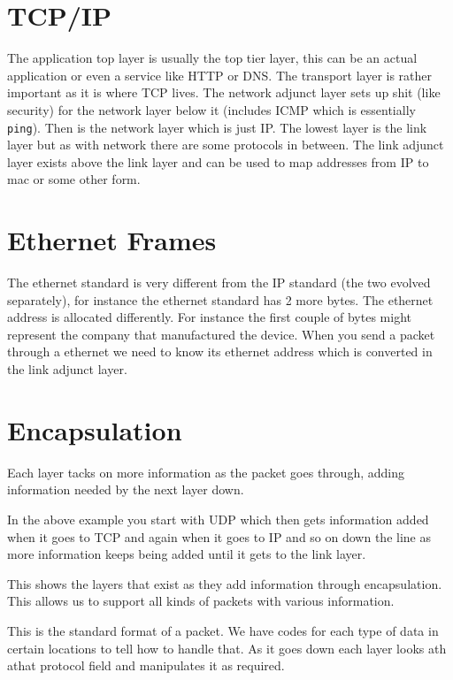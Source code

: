 \documentclass{article}
\begin{document}



\section{TCP/IP} %
\label{sec:tcp_ip}
The application top layer is usually the top tier layer, this can be an actual application or even a service like HTTP or DNS. The transport layer is rather important as it is where TCP lives. The network adjunct layer sets up shit (like security) for the network layer below it (includes ICMP which is essentially \texttt{ping}). Then is the network layer which is just IP. The lowest layer is the link layer but as with network there are some protocols in between. The link adjunct layer exists above the link layer and can be used to map addresses from IP to mac or some other form. 


\section{Ethernet Frames} %
\label{sec:ethernet_frames}
The ethernet standard is very different from the IP standard (the two evolved separately), for instance the ethernet standard has 2 more bytes. The ethernet address is allocated differently. For instance the first couple of bytes might represent the company that manufactured the device.  When you send a packet through a ethernet we need to know its ethernet address which is converted in the link adjunct layer.



\section{Encapsulation} %
\label{sec:encapsulation}
Each layer tacks on more information as the packet goes through, adding information needed by the next layer down. 

In the above example you start with UDP which then gets information added when it goes to TCP and again when it goes to IP and so on down the line as more information keeps being added until it gets to the link layer. 


This shows the layers that exist as they add information through encapsulation. This allows us to support all kinds of packets with various information. 


This is the standard format of a packet. We have codes for each type of data in certain locations to tell how to handle that. As it goes down each layer looks ath athat protocol field and manipulates it as required. 
\end{document}
